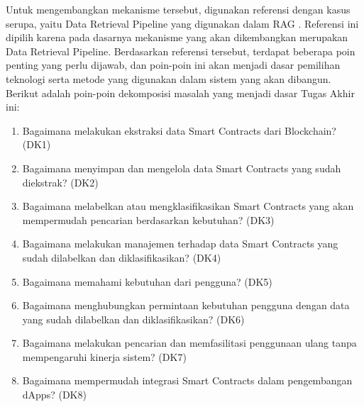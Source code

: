 
Untuk mengembangkan mekanisme tersebut, digunakan referensi dengan kasus serupa, yaitu Data Retrieval Pipeline yang digunakan dalam RAG \parencite{CrateDB_RAG_Pipelines}. Referensi ini dipilih karena pada dasarnya mekanisme yang akan dikembangkan merupakan Data Retrieval Pipeline. Berdasarkan referensi tersebut, terdapat beberapa poin penting yang perlu dijawab, dan poin-poin ini akan menjadi dasar pemilihan teknologi serta metode yang digunakan dalam sistem yang akan dibangun. Berikut adalah poin-poin dekomposisi masalah yang menjadi dasar Tugas Akhir ini:

\begin{enumerate}
  \item Bagaimana melakukan ekstraksi data Smart Contracts dari Blockchain? (DK1)
  \item Bagaimana menyimpan dan mengelola data Smart Contracts yang sudah diekstrak? (DK2)
  \item Bagaimana melabelkan atau mengklasifikasikan Smart Contracts yang akan mempermudah pencarian berdasarkan kebutuhan? (DK3)
  \item Bagaimana melakukan manajemen terhadap data Smart Contracts yang sudah dilabelkan dan diklasifikasikan? (DK4)
  \item Bagaimana memahami kebutuhan dari pengguna? (DK5)
  \item Bagaimana menghubungkan permintaan kebutuhan pengguna dengan data yang sudah dilabelkan dan diklasifikasikan? (DK6)
  \item Bagaimana melakukan pencarian dan memfasilitasi penggunaan ulang tanpa mempengaruhi kinerja sistem? (DK7)
  \item Bagaimana mempermudah integrasi Smart Contracts dalam pengembangan dApps? (DK8)
\end{enumerate}

